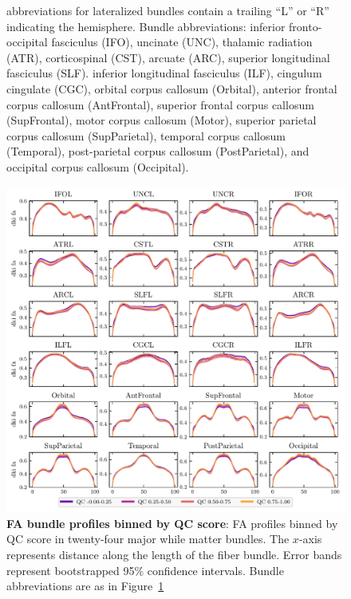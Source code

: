 \documentclass[fleqn,10pt,inline]{wlscirep}
\begin{document}
\begin{figure}[tbp]
{        abbreviations for lateralized bundles contain a trailing ``L'' or ``R''
        indicating the hemisphere. Bundle abbreviations:
        inferior fronto-occipital fasciculus (IFO),
        uncinate (UNC),
        thalamic radiation (ATR),
        corticospinal (CST),
        arcuate (ARC),
        superior longitudinal fasciculus (SLF).
        inferior longitudinal fasciculus (ILF),
        cingulum cingulate (CGC),
        orbital corpus callosum (Orbital),
        anterior frontal corpus callosum (AntFrontal),
        superior frontal corpus callosum (SupFrontal),
        motor corpus callosum (Motor),
        superior parietal corpus callosum (SupParietal),
        temporal corpus callosum (Temporal),
        post-parietal corpus callosum (PostParietal), and
        occipital corpus callosum (Occipital).
    }
    \label{fig:qc-profiles:md}
\end{figure}
\begin{figure}[tbp]
    \centering
    \includegraphics[width=\linewidth]{qc-bins-dki-fa.pdf}
    \caption[FA bundle profiles]{%
        {\bf FA bundle profiles binned by QC score}:
        FA profiles binned by QC score in twenty-four major while matter
        bundles. The $x$-axis represents distance along the length of the fiber
        bundle. Error bands represent bootstrapped 95\% confidence intervals.
        Bundle abbreviations are as in Figure~\ref{fig:qc-profiles:md}
    }
    \label{fig:qc-profiles:fa}
\end{figure}
\end{document}
